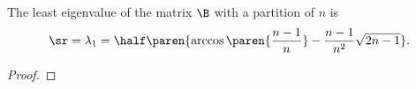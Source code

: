 \begin{theorem}
The least eigenvalue of the matrix $\B$ with a partition of $n$ is
  \begin{equation}
    \sr = \lambda_{1} = \half \paren{ \arccos \paren{\frac{n-1} {n}} - \frac{n-1}{n^{2}} \sqrt{2n - 1}}.
    \label{eq:le}
  \end{equation}
\label{th:spectral radius}
\end{theorem}
\begin{proof}

\end{proof}

\endinput %